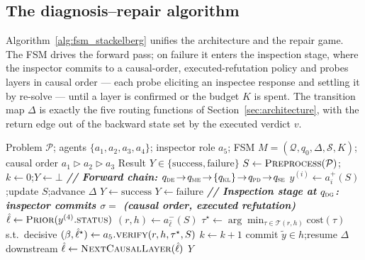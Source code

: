 \documentclass[a4paper,fleqn]{cas-sc}
\newcommand{\Qcal}{\mathcal{Q}}
\newcommand{\Scal}{\mathcal{S}}
\newcommand{\tri}{\triangleright}
\begin{document}
\subsection{The diagnosis--repair algorithm}
\label{sec:algorithm}

Algorithm~\ref{alg:fsm_stackelberg} unifies the architecture and the repair
game. The FSM drives the forward pass; on failure it enters the inspection
stage, where the inspector commits to a causal-order, executed-refutation
policy and probes layers in causal order --- each probe eliciting an
inspectee response and settling it by re-solve --- until a layer is confirmed
or the budget $K$ is spent. The transition map $\Delta$ is exactly the five
routing functions of Section~\ref{sec:architecture}, with the return edge out
of the backward state set by the executed verdict $v$.

\begin{algorithm}[htbp]
\caption{FSM-Stackelberg diagnosis--repair (inspection game)}\label{alg:fsm_stackelberg}
\begin{algorithmic}[1]
\Require Problem $\mathcal{P}$; agents $\{a_1,a_2,a_3,a_4\}$; inspector role $a_5$; FSM $M=(\Qcal,q_0,\Delta,\Scal,K)$; causal order $a_1\tri a_2\tri a_3$
\Ensure Result $Y\in\{\text{success},\text{failure}\}$
\State $S\gets\textsc{Preprocess}(\mathcal{P})$;\quad $k\gets 0$;\quad $Y\gets\bot$
 
    \State \textit{\textbf{// Forward chain: $q_{\textsc{de}}\!\to\!q_{\textsc{me}}\!\to\!\{q_{\textsc{kl}}\}\!\to\!q_{\textsc{pd}}\!\to\!q_{\textsc{se}}$}}
        \State $y^{(i)}\gets a_i^{+}(S)$;\quad update $S$;\quad advance $\Delta$
    \EndFor
        \State $Y\gets\text{success}$
        \State $Y\gets\text{failure}$
    \Else
        \State \textit{\textbf{// Inspection stage at $q_{\textsc{dg}}$: inspector commits $\sigma=$ (causal order, executed refutation)}}
        \State $\hat{\ell}\gets\textsc{Prior}(y^{(4)}.\textsc{status})$ 
        \Repeat
            \State $(r,h)\gets a_{\hat{\ell}}^{-}(S)$ 
            \State $\tau^{\star}\gets\arg\min_{\tau\in\mathcal{T}(r,h)}\mathrm{cost}(\tau)$ s.t.\ decisive
            \State $(\beta,\hat{\ell}^{\star})\gets a_{5}\textsc{.verify}(r,h,\tau^{\star},S)$ 
            \State $k\gets k+1$
              commit $\tilde{y}\in h$;\quad resume $\Delta$ downstream \EndIf
            \State $\hat{\ell}\gets\textsc{NextCausalLayer}(\hat{\ell})$ 
    \EndIf
\EndWhile
\State \Return $Y$
\end{algorithmic}
\end{algorithm}
\end{document}
